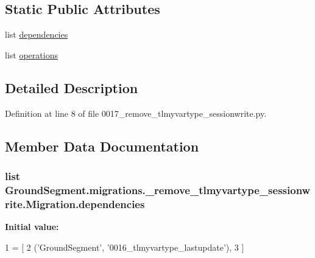 \subsection*{Static Public Attributes}
\begin{DoxyCompactItemize}
\item 
list \hyperlink{class_ground_segment_1_1migrations_1_10017__remove__tlmyvartype__sessionwrite_1_1_migration_a834bbef1afca58d48851dacf7d817630}{dependencies}
\item 
list \hyperlink{class_ground_segment_1_1migrations_1_10017__remove__tlmyvartype__sessionwrite_1_1_migration_a8c1bd604c6975a90c7ff8dae829c99d0}{operations}
\end{DoxyCompactItemize}


\subsection{Detailed Description}


Definition at line 8 of file 0017\+\_\+remove\+\_\+tlmyvartype\+\_\+sessionwrite.\+py.



\subsection{Member Data Documentation}
\hypertarget{class_ground_segment_1_1migrations_1_10017__remove__tlmyvartype__sessionwrite_1_1_migration_a834bbef1afca58d48851dacf7d817630}{}
\subsubsection[{dependencies}]{\setlength{\rightskip}{0pt plus 5cm}list Ground\+Segment.\+migrations.\+\_\+remove\+\_\+tlmyvartype\+\_\+sessionwrite.\+Migration.\+dependencies\hspace{0.3cm}{\ttfamily [static]}}\label{class_ground_segment_1_1migrations_1_10017__remove__tlmyvartype__sessionwrite_1_1_migration_a834bbef1afca58d48851dacf7d817630}
{\bfseries Initial value\+:}
\begin{DoxyCode}
1 = [
2         (\textcolor{stringliteral}{'GroundSegment'}, \textcolor{stringliteral}{'0016\_tlmyvartype\_lastupdate'}),
3     ]
\end{DoxyCode}


